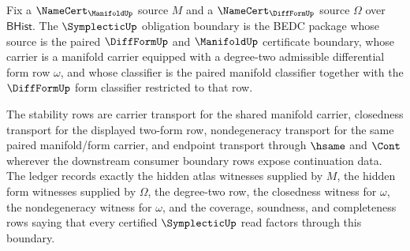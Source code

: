 \begin{definition}
\label{def:symplectic-obligation-boundary}
Fix a $\NameCert_{\ManifoldUp}$ source $M$ and a $\NameCert_{\DiffFormUp}$ source $\Omega$ over $\mathsf{BHist}$. The $\SymplecticUp$ obligation boundary is the BEDC package whose source is the paired $\DiffFormUp$ and $\ManifoldUp$ certificate boundary, whose carrier is a manifold carrier equipped with a degree-two admissible differential form row $\omega$, and whose classifier is the paired manifold classifier together with the $\DiffFormUp$ form classifier restricted to that row.

The stability rows are carrier transport for the shared manifold carrier, closedness transport for the displayed two-form row, nondegeneracy transport for the same paired manifold/form carrier, and endpoint transport through $\hsame$ and $\Cont$ wherever the downstream consumer boundary rows expose continuation data. The ledger records exactly the hidden atlas witnesses supplied by $M$, the hidden form witnesses supplied by $\Omega$, the degree-two row, the closedness witness for $\omega$, the nondegeneracy witness for $\omega$, and the coverage, soundness, and completeness rows saying that every certified $\SymplecticUp$ read factors through this boundary.
\end{definition}

